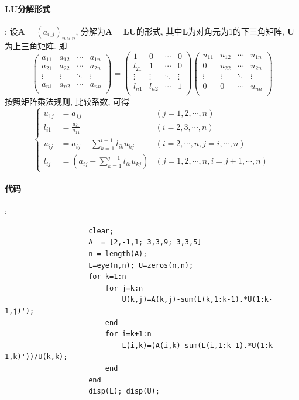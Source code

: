 \documentclass{article}
\begin{document}
\begin{CJK*}{UTF8}{song}
			\paragraph{LU分解形式}
			:\newline
				设$\mathbf{A} = \left(a_{i,j}\right)_{n \times n}$, 分解为$\mathbf{A} = \mathbf{LU}$的形式, 其中$\mathbf{L}$为对角元为1的下三角矩阵, $\mathbf{U}$为上三角矩阵. 即
				$$
				\left(
					\begin{matrix}
						a_{11} & a_{12} & \cdots & a_{1n} \\
						a_{21} & a_{22} & \cdots & a_{2n} \\
						\vdots & \vdots & \ddots & \vdots \\
						a_{n1} & a_{n2} & \cdots & a_{nn} \\
					\end{matrix}
				\right) =
				\left(
					\begin{matrix}
						1 & 0 & \cdots & 0 \\
						l_{21} & 1 & \cdots & 0 \\
						\vdots & \vdots & \ddots & \vdots \\
						l_{n1} & l_{n2} & \cdots & 1 \\
					\end{matrix}
				\right) 
				\left(
				\begin{matrix}
					u_{11} & u_{12} & \cdots & u_{1n} \\
					0 & u_{22} & \cdots & u_{2n}\\
				\vdots & \vdots & \ddots & \vdots \\
				0 & 0 & \cdots & u_{nn} \\
				\end{matrix}
				\right)
				$$
				按照矩阵乘法规则, 比较系数, 可得
				$$
				\left\{
					\begin{aligned}
						u_{1j} &= a_{1j}  &\left(j=1,2,\cdots,n\right) \\
						l_{i1} &= \frac{a_{i1}}{u_{11}} &\left(i=2,3,\cdots,n \right)\\
						u_{ij} &= a_{ij} - \sum_{k=1}^{i-1}l_{ik}u_{kj} &\left(i=2,\cdots,n,j=i,\cdots,n\right) \\
						l_{ij} &= \left(a_{ij} - \sum_{k=1}^{j-1}l_{ik}u_{kj}\right) &\left(j=1,2,\cdots,n,i=j+1,\cdots,n\right)
					\end{aligned}
				\right.$$
			\paragraph{代码}
			:\newline
				\begin{lstlisting}
					clear;
					A  = [2,-1,1; 3,3,9; 3,3,5]
					n = length(A);
					L=eye(n,n); U=zeros(n,n);
					for k=1:n
						for j=k:n
							U(k,j)=A(k,j)-sum(L(k,1:k-1).*U(1:k-1,j)');
						end
						for i=k+1:n
							L(i,k)=(A(i,k)-sum(L(i,1:k-1).*U(1:k-1,k)'))/U(k,k);
						end
					end
					disp(L); disp(U);
				\end{lstlisting}

\end{CJK*}
\end{document}
